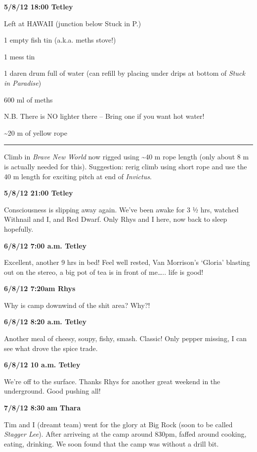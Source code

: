 \textbf{5/8/12 18:00 Tetley}

Left at HAWAII (junction below Stuck in P.)

1 empty fish tin (a.k.a. meths stove!)

1 mess tin

1 daren drum full of water (can refill by placing under drips at bottom
of \emph{Stuck in Paradise})

600 ml of meths

N.B. There is NO lighter there -- Bring one if you want hot water!

\textasciitilde 20 m of yellow rope

\begin{center}\rule{0.5\linewidth}{\linethickness}\end{center}

Climb in \emph{Brave New World} now rigged using \textasciitilde 40 m
rope length (only about 8 m is actually needed for this). Suggestion:
rerig climb using short rope and use the 40 m length for exciting pitch
at end of \emph{Invictus}.

\textbf{5/8/12 21:00 Tetley}

Consciousness is slipping away again. We've been awake for 3 ½ hrs,
watched Withnail and I, and Red Dwarf. Only Rhys and I here, now back to
sleep hopefully.

\textbf{6/8/12 7:00 a.m. Tetley}

Excellent, another 9 hrs in bed! Feel well rested, Van Morrison's
`Gloria' blasting out on the stereo, a big pot of tea is in front of
me\ldots{}.. life is good!

\textbf{6/8/12 7:20am Rhys}

Why is camp downwind of the shit area? Why?!

\textbf{6/8/12 8:20 a.m. Tetley}

Another meal of cheesy, soupy, fishy, smash. Classic! Only pepper
missing, I can see what drove the spice trade.

\textbf{6/8/12 10 a.m. Tetley}

We're off to the surface. Thanks Rhys for another great weekend in the
underground. Good pushing all!

\textbf{7/8/12 8:30} \textbf{am} \textbf{Thara}

Tim and I (dreamt team) went for the glory at Big Rock (soon to be
called \emph{Stagger Lee}). After arriveing at the camp around 830pm,
faffed around cooking, eating, drinking. We soon found that the camp was
without a drill bit.

